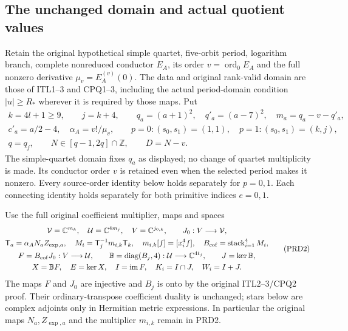 \subsection{The unchanged domain and actual quotient values}
Retain the original hypothetical simple quartet, five-orbit period,
logarithm branch, complete nonreduced conductor $E_A$, its order
$v=\operatorname{ord}_0E_A$ and the full nonzero derivative
$\mu_v=E_A^{(v)}(0)$. The data and original rank-valid domain are
those of ITL1--3 and CPQ1--3, including the actual period-domain
condition $|u|\ge R_*$ wherever it is required by those maps. Put
\[
\begin{gathered}
 k=4l+1\ge9,\qquad j=k+4,\qquad
 q_a=(a+1)^2,\quad q'_a=(a-7)^2,\quad m_a=q_a-v-q'_a,\\
 c'_a=a/2-4,\quad \alpha_A=v!/\mu_v,\qquad
 p=0:(s_0,s_1)=(1,1),\quad p=1:(s_0,s_1)=(k,j),\\
 q=q_j,\qquad N\in[q-1,2q]\cap\mathbb Z,\qquad D=N-v.
\end{gathered}                                                    \tag{PRD1}
\]
The simple-quartet domain fixes $q_a$ as displayed; no change of
quartet multiplicity is made. Its conductor order $v$ is retained
even when the selected period makes it nonzero. Every source-order
identity below holds separately for $p=0,1$. Each connecting identity
holds separately for both primitive indices $e=0,1$.

Use the full original coefficient multiplier, maps and spaces
\[
\begin{gathered}
 \mathcal V=\mathbb C^{m_k},\quad
 \mathcal U=\mathbb C^{4m_j},\quad
 V=\mathbb C^{j_{0,k}},\qquad J_0:V\longrightarrow\mathcal V,\\
 \mathsf T_a=\alpha_A N_aZ_{\exp,a},\quad
 M_i=\mathsf T_j^{-1}m_{i,k}\mathsf T_k,\quad
 m_{i,k}[f]=[x_i^4f],\quad
 B_{\rm cof}=\operatorname{stack}_{i=1}^4M_i,\\
 F=B_{\rm cof}J_0:V\longrightarrow\mathcal U,\qquad
 \mathbb B=\operatorname{diag}(B_j,4):\mathcal U
          \longrightarrow\mathbb C^{4t_j},\qquad
 J=\ker\mathbb B,\\
 X=\mathbb BF,\quad E=\ker X,\quad
 I=\operatorname{im}F,\quad K_i=I\cap J,\quad W_i=I+J.
\end{gathered}                                                    \tag{PRD2}
\]
The maps $F$ and $J_0$ are injective and $B_j$ is onto by the
original ITL2--3/CPQ2 proof. Their ordinary-transpose coefficient
duality is unchanged; stars below are complex adjoints only in
Hermitian metric expressions. In particular the original maps
$N_a,Z_{\exp,a}$ and the multiplier $m_{i,k}$ remain in PRD2.

